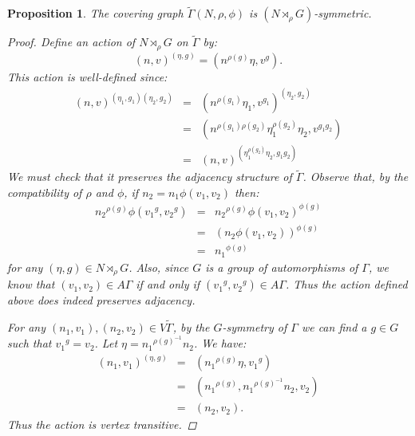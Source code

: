\documentclass[12pt]{amsart}
\theoremstyle{plain}
\newtheorem{proposition}{Proposition}
\theoremstyle{definition}
\theoremstyle{remark}
\begin{document}
\begin{proposition}
The covering graph $\widetilde{\Gamma}(N,\rho,\phi)$ is $(N \rtimes_\rho G)$-symmetric.
\begin{proof}

Define an action of $N \rtimes_\rho G$ on $\widetilde{\Gamma}$ by:
$$(n,v)^{(\eta, g)} = (n^{\rho(g)} \eta,v^g).$$
This action is well-defined since:
\begin{eqnarray*}
(n,v)^{(\eta_1, g_1)(\eta_2, g_2)} 
& = & (n^{\rho(g_1)} \eta_1 ,v^{g_1})^{(\eta_2, g_2)} \\
& = & (n^{\rho(g_1) \rho(g_2)} \eta_1^{\rho(g_2)} \eta_2 , v^{g_1 g_2}) \\
& = & (n,v)^{(\eta_1^{\rho(g_2)} \eta_2, g_1 g_2)}
\end{eqnarray*}
We must check that it preserves the adjacency structure of $\widetilde{\Gamma}$.
Observe that, by the compatibility of $\rho$ and $\phi$, 
if $n_2 = n_1 \phi(v_1,v_2)$ then:
\begin{eqnarray*}
{n_2}^{\rho(g)} \phi({v_1}^g, {v_2}^g)
& = & {n_2}^{\rho(g)} \phi(v_1, v_2)^{\phi(g)} \\
& = & (n_2 \phi(v_1, v_2))^{\phi(g)} \\
& = & {n_1}^{\phi(g)} 
\end{eqnarray*}
for any $(\eta,g) \in N \rtimes_\rho G$.
Also, since $G$ is a group of automorphisms of $\Gamma$, we know that
$(v_1,v_2) \in A \Gamma$ if and only if $({v_1}^g,{v_2}^g) \in A \Gamma$.
Thus the action defined above does indeed preserves adjacency.

\hfill \break
For any $(n_1,v_1), (n_2,v_2) \in V \widetilde{\Gamma}$, 
by the $G$-symmetry of $\Gamma$ we can find a $g \in G$ 
such that ${v_1}^g = {v_2}$.
Let $\eta = {n_1}^{\rho(g)^{-1}} n_2$.
We have:
\begin{eqnarray*}
(n_1,v_1)^{(\eta,g)} & = & ({n_1}^{\rho(g)} \eta,{v_1}^g) \\
                    & = & ( {n_1}^{\rho(g)}, {n_1}^{\rho(g)^{-1}} n_2,v_2) \\
		    & = & (n_2,v_2).
\end{eqnarray*}
Thus the action is vertex transitive.


\end{proof}
\end{proposition}
\end{document}
